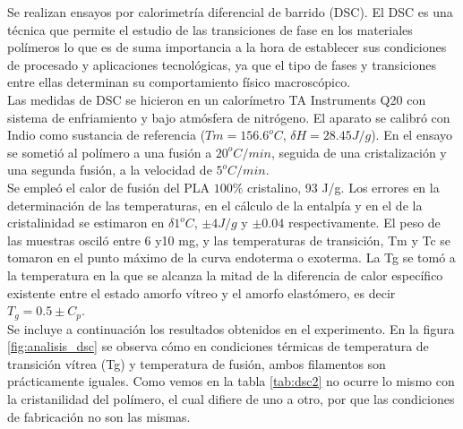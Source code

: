 Se realizan ensayos por calorimetría diferencial de barrido (DSC). El DSC es una técnica que permite el estudio de las transiciones de fase en los materiales polímeros\cite{DSC1} lo que es de suma importancia a la hora de establecer sus condiciones de procesado y aplicaciones tecnológicas, ya que el tipo de fases y transiciones entre ellas determinan su comportamiento físico macroscópico.\\

Las medidas de DSC se hicieron en un calorímetro TA Instruments Q20 con sistema de enfriamiento y bajo atmósfera de nitrógeno. El aparato se calibró con Indio como sustancia de referencia ($Tm = 156.6 ^o C$, $\delta H = 28.45 J/g$). En el ensayo se sometió al polímero a una fusión a $20 ^o C/min$, seguida de una cristalización y una segunda fusión, a la velocidad de $5 ^o C/min$.\\

Se empleó el calor de fusión del PLA $100\%$ cristalino, 93 J/g. Los errores en la determinación de las temperaturas, en el cálculo de la entalpía y en el de la cristalinidad se estimaron en $\delta1 ^o C$, $\pm4 J/g$ y $\pm0.04$ respectivamente. El peso de las muestras osciló entre 6 y10 mg, y las temperaturas de transición, Tm y Tc se tomaron en el punto máximo de la curva endoterma o exoterma. La Tg se tomó a la temperatura en la que se alcanza la mitad de la diferencia de calor específico existente entre el estado amorfo vítreo y el amorfo elastómero, es decir $T_{g} = 0.5 \pm C_{p}$.\\

Se incluye a continuación los resultados obtenidos en el experimento. En la figura \ref{fig:analisis_dsc} se observa cómo en condiciones térmicas de temperatura de transición vítrea (Tg) y temperatura de fusión, ambos filamentos son prácticamente iguales. Como vemos en la tabla \ref{tab:dsc2} no ocurre lo mismo con la cristanilidad del polímero, el cual difiere de uno a otro, por que las condiciones de fabricación no son las mismas.\\

